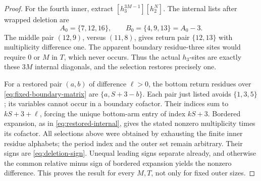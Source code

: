 \documentclass[11pt,a4paper]{amsart}
\numberwithin{equation}{section}
\theoremstyle{plain}
\theoremstyle{definition}
\begin{document}
\begin{proof}
For the fourth inner, extract \([h_3^{3M-1}][h_2^N]\).  The internal lists after wrapped deletion are
\[
 A_0=\{7,12,16\},\qquad B_0=\{4,9,13\}=A_0-3.
\]
The middle pair \((12,9)\), versus \((11,8)\), gives return pair \(\{12,13\}\) with multiplicity difference one.  The apparent boundary residue-three sites would require \(0\) or \(M\) in \(T\), which never occurs.  Thus the actual \(h_3\)-sites are exactly these \(3M\) internal diagonals, and the selection restores precisely one.

For a restored pair \((a,b)\) of difference \(\ell>0\), the bottom return residues over \eqref{eq:fixed-boundary-matrix} are \(\{a,S+3-b\}\).  Each pair just listed avoids \(\{1,3,5\}\); its variables cannot occur in a boundary cofactor.  Their indices sum to \(kS+3+\ell\), forcing the unique bottom-arm entry of index \(kS+3\).  Bordered expansion, as in \eqref{eq:restored-internal}, gives the stated nonzero multiplicity times its cofactor.  All selections above were obtained by exhausting the finite inner residue alphabets; the period index and the outer set remain arbitrary.  Their signs are \eqref{eq:deletion-sign}.  Unequal leading signs separate already, and otherwise the common relative minus sign of bordered expansion yields the nonzero difference.  This proves the result for every \(M,T\), not only for fixed outer sizes.
\end{proof}
\end{document}
